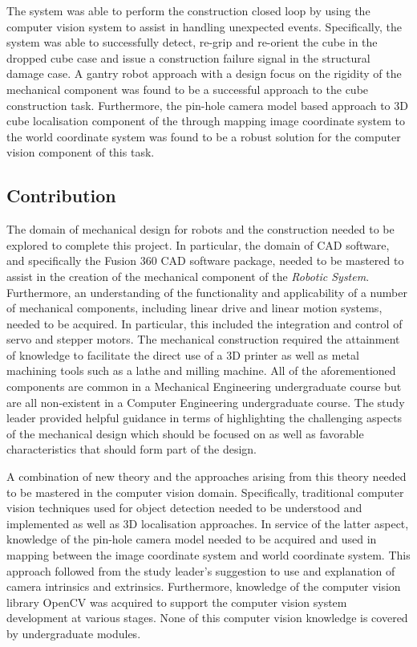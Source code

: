 The system was able to perform the construction closed loop by using the computer vision system to assist in handling unexpected events. Specifically, the system was able to successfully detect, re-grip and re-orient the cube in the dropped cube case and issue a construction failure signal in the structural damage case. A gantry robot approach with a design focus on the rigidity of the mechanical component was found to be a successful approach to the cube construction task. Furthermore, the pin-hole camera model based approach to 3D cube localisation component of the through mapping image coordinate system to the world coordinate system was found to be a robust solution for the computer vision component of this task.

\subsection{Contribution}

The domain of mechanical design for robots and the construction needed to be explored to complete this project. In particular, the domain of CAD software, and specifically the Fusion 360 CAD software package, needed to be mastered to assist in the creation of the mechanical component of the \textit{Robotic System}. Furthermore, an understanding of the functionality and applicability of a number of mechanical components, including linear drive and linear motion systems, needed to be acquired. In particular, this included the integration and control of servo and stepper motors. The mechanical construction required the attainment of knowledge to facilitate the direct use of a 3D printer as well as metal machining tools such as a lathe and milling machine. All of the aforementioned components are common in a Mechanical Engineering undergraduate course but are all non-existent in a Computer Engineering undergraduate course. The study leader provided helpful guidance in terms of highlighting the challenging aspects of the mechanical design which should be focused on as well as favorable characteristics that should form part of the design.

A combination of new theory and the approaches arising from this theory needed to be mastered in the computer vision domain. Specifically, traditional computer vision techniques used for object detection needed to be understood and implemented as well as 3D localisation approaches. In service of the latter aspect, knowledge of the pin-hole camera model needed to be acquired and used in mapping between the image coordinate system and world coordinate system. This approach followed from the study leader's suggestion to use and explanation of camera intrinsics and extrinsics. Furthermore, knowledge of the computer vision library OpenCV was acquired to support the computer vision system development at various stages. None of this computer vision knowledge is covered by undergraduate modules. 

